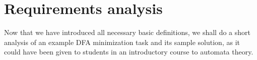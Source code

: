 %
%

\section{Requirements analysis}

Now that we have introduced all necessary basic definitions, we shall do a short analysis of an example DFA minimization task and its sample solution, as it could have been given to students in an introductory course to automata theory.


